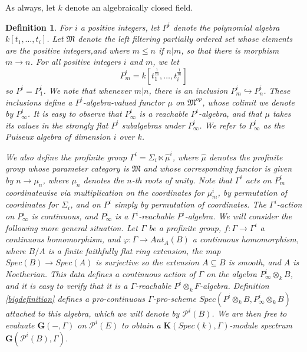 \documentclass[11pt]{article}
\newcommand\mc{\mathcal}
\def \bK{\mathbf K}
\newcommand\mfk{\mathbf G}
\newtheorem{Definition}{Definition}[section]
\begin{document}
As always, let $k$ denote an algebraically closed field.  
\begin{Definition} \label{unidefinition} For $i$ a positive integers, let  $P^i$ denote the polynomial algebra $k[t_1, \ldots , t_i]$.   Let   $\mathfrak{M}$ denote the left  filtering partially ordered set whose elements are the  positive integers,and where $m \leq  n$ if $n|m$, so that there is morphism $m \rightarrow n$. For all  positive integers $i$ and  $m$, we let 
$$P^i _m = k[t^{\frac{1}{m}}_1, \ldots ,  t_i ^{\frac{1}{m}}]$$
so $P^i = P^i _1$.  
We note that whenever $m|n$, there is an inclusion $P^i _m \hookrightarrow P^i _n$. These inclusions  define a $P^i $-algebra-valued functor $\mu$  on $\mathfrak{M}^{op}$, whose colimit we denote by $P_{\infty}^i $. It is easy to observe that $P_{\infty}^i $ is  a reachable $P^i$-algebra, and that $\mu$ takes its values in the strongly flat $P^i$ subalgebras under $P^i _{\infty}$.  We refer to $P_{\infty}^i $ as the {\em Puiseux algebra} of dimension $i$ over $k$.  

We also define the profinite group $\Gamma ^i = \Sigma _i \ltimes \hat{\mu}^i$, where $\hat{\mu}$ denotes the profinite group whose  parameter category is $\mathfrak{M}$ and whose corresponding functor is given by $n \rightarrow \mu_n$, where $\mu _n$ denotes the
$n$-th roots of unity. 
Note that  $\Gamma ^i$ acts on $P^i_m $  coordinatewise via multiplication on the coordinates for $\mu _m^i$,  by permutation of coordinates for $\Sigma _i$, and on $P^i $ simply by  permutation of coordinates.  The  $\Gamma ^i$-action on $P_{\infty}^i$ is continuous, and $P_{\infty}^i $ is a $\Gamma ^i$-reachable $P^i$-algebra. We will  consider the following  more general situation.  Let $\Gamma$ be a profinite group, $f:\Gamma \rightarrow \Gamma ^i$ a  continuous homomorphism, and $\varphi:\Gamma \rightarrow Aut_A(B)$ a continuous homomorphism, where $B/A$ is a finite faithfully flat ring  extension, the map $Spec(B) \rightarrow Spec(A) $ is surjective so the extension $A \subseteq B$ is smooth, and $A$ is Noetherian.   This data defines a continuous action of $\Gamma$ on  the algebra $P^i _{\infty} \otimes _k B$, and it is easy to verify that it is a $\Gamma$-reachable $P^i \otimes _k F$-algebra. Definition \ref{bigdefinition} defines a pro-continuous $\Gamma$-pro-scheme $Spec(P^i \otimes _k B,P^i_{\infty}\otimes _k B)$ attached to this algebra, which we will denote by $\mc{P}^i(B) $.  We are then free to evaluate   $\mfk(-,\Gamma )$ on $\mc{P}^i(E)$ to obtain a $\bK(Spec(k),\Gamma )$-module spectrum $\mfk(\mc{P}^i(B),\Gamma)$. 
 
\end{Definition}
\end{document}
